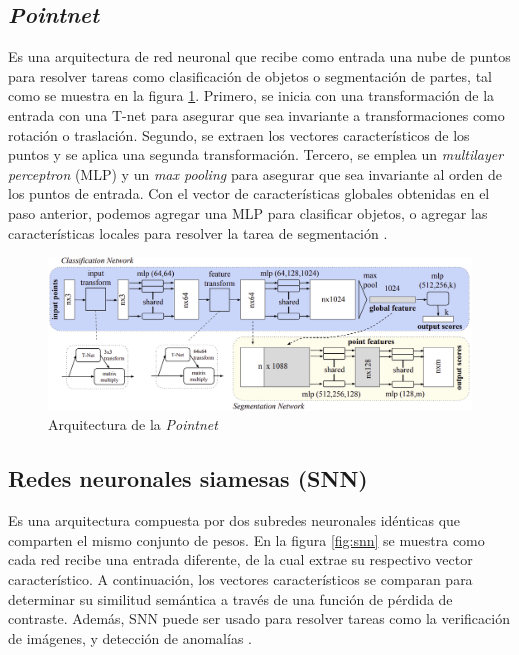 

\subsection{\textit{Pointnet}}
Es una arquitectura de red neuronal que recibe como entrada una nube de puntos para resolver tareas como clasificación de objetos o segmentación de partes, tal como se muestra en la figura \ref{fig:pointnet}. Primero, se inicia con una transformación de la entrada con una T-net para asegurar que sea invariante a transformaciones como rotación o traslación. Segundo, se extraen los vectores característicos de los puntos y se aplica una segunda transformación. Tercero, se emplea un \textit{multilayer perceptron} (MLP) y un \textit{max pooling} para asegurar que sea invariante al orden de los puntos de entrada. Con el vector de características globales obtenidas en el paso anterior, podemos agregar una MLP para clasificar objetos, o agregar las características locales para resolver la tarea de segmentación \cite{14}.

\begin{figure}[!h]
    \centering
     \includegraphics[scale=0.19]{images/pointnet.png}
    \caption{Arquitectura de la \textit{Pointnet} \cite{14}}
    \label{fig:pointnet}
\end{figure}

\subsection{Redes neuronales siamesas (SNN)}
Es una arquitectura compuesta por dos subredes neuronales idénticas que comparten el mismo conjunto de pesos. En la figura \ref{fig:snn} se muestra como cada red recibe una entrada diferente, de la cual extrae su respectivo vector característico. A continuación, los vectores característicos se comparan para determinar su similitud semántica a través de una función de pérdida de contraste. Además, SNN puede ser usado para resolver tareas como la verificación de imágenes, y detección de anomalías \cite{15}. 

